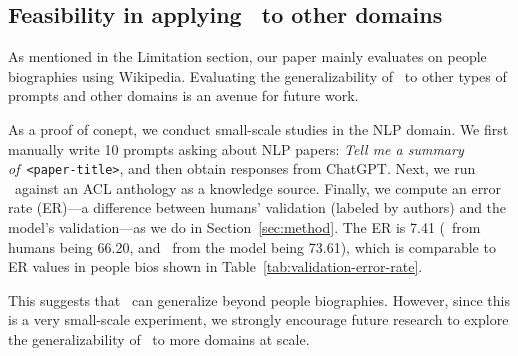 \subsection{Feasibility in applying \ours\ to other domains}\label{app:nlp-domain}
As mentioned in the Limitation section, our paper mainly evaluates on people biographies using Wikipedia. Evaluating the generalizability of \ours\ to other types of prompts and other domains is an avenue for future work.

As a proof of conept, we conduct small-scale studies in the NLP domain. We first manually write 10 prompts asking about NLP papers: \emph{Tell me a summary of}~\texttt{<paper-title>}, and then obtain responses from ChatGPT. Next, we run \ours\ against an ACL anthology as a knowledge source. Finally, we compute an error rate (ER)---a difference between humans’ validation (labeled by authors) and the model’s validation---as we do in Section~\ref{sec:method}. The ER is 7.41 (\ours\ from humans being 66.20, and \ours\ from the model being 73.61), which is comparable to ER values in people bios shown in Table~\ref{tab:validation-error-rate}. 

This suggests that \ours\ can generalize beyond people biographies. However, since this is a very small-scale experiment, we strongly encourage future research to explore the generalizability of \ours\ to more domains at scale.

